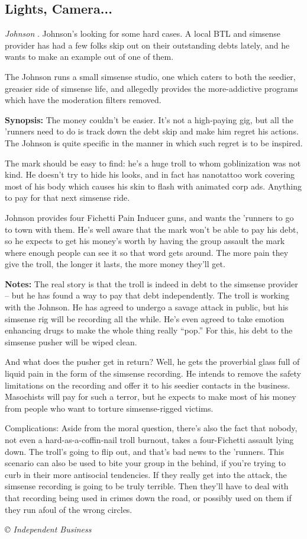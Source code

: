 \documentclass[letterpaper,onecolumn,10pt]{article}
\renewcommand{\textsc}[1]{{\fontspec{Friz Quadrata SC TT}\selectfont #1}}
\newcommand{\getyear}[1]{\StrLeft{#1}{4}}
\newenvironment{scenario}[6]
	{
		\section[#1 {\small\textsc{[#2]}}]{#1} \nopagebreak

		\noindent{\textsc{#2}}\nopagebreak

		\noindent\textit{#3}\nopagebreak
		\def\TMPSCENARIO{{\small\textit{©\getyear{#5}{} #4}}}
	}
	{\TMPSCENARIO}
\newcommand{\johnson}[2]{\textbf{Johnson: #1 (#2):}}
\newcommand{\synopsis}{\textbf{Synopsis: }}
\newcommand{\notes}{\textbf{Notes: }}
\begin{document}
\begin{multicols}{2}
\begin{scenario}{Lights, Camera...}
\johnson{Johnson}{Independent Business}  Mr. Johnson's looking for some hard cases. A local BTL and simsense provider has had a few folks skip out on their outstanding debts lately, and he wants to make an example out of one of them.

The Johnson runs a small simsense studio, one which caters to both the seedier, greasier side of simsense life, and allegedly provides the more-addictive programs which have the moderation filters removed.

\synopsis  The money couldn't be easier. It's not a high-paying gig, but all the 'runners need to do is track down the debt skip and make him regret his actions. The Johnson is quite specific in the manner in which such regret is to be inspired.

The mark should be easy to find: he's a huge troll to whom goblinization was not kind. He doesn't try to hide his looks, and in fact has nanotattoo work covering most of his body which causes his skin to flash with animated corp ads. Anything to pay for that next simsense ride.

Johnson provides four Fichetti Pain Inducer guns, and wants the 'runners to go to town with them. He's well aware that the mark won't be able to pay his debt, so he expects to get his money's worth by having the group assault the mark where enough people can see it so that word gets around. The more pain they give the troll, the longer it lasts, the more money they'll get.

\notes  The real story is that the troll is indeed in debt to the simsense provider – but he has found a way to pay that debt independently. The troll is working with the Johnson. He has agreed to undergo a savage attack in public, but his simsense rig will be recording all the while. He's even agreed to take emotion enhancing drugs to make the whole thing really ``pop.'' For this, his debt to the simsense pusher will be wiped clean.

And what does the pusher get in return? Well, he gets the proverbial glass full of liquid pain in the form of the simsense recording. He intends to remove the safety limitations on the recording and offer it to his seedier contacts in the business. Masochists will pay for such a terror, but he expects to make most of his money from people who want to torture simsense-rigged victims.

Complications: Aside from the moral question, there's also the fact that nobody, not even a hard-as-a-coffin-nail troll burnout, takes a four-Fichetti assault lying down. The troll's going to flip out, and that's bad news to the 'runners. This scenario can also be used to bite your group in the behind, if you're trying to curb in their more antisocial tendencies. If they really get into the attack, the simsense recording is going to be truly terrible. Then they'll have to deal with that recording being used in crimes down the road, or possibly used on them if they run afoul of the wrong circles. 


\end{scenario}
\end{multicols}
\end{document}

